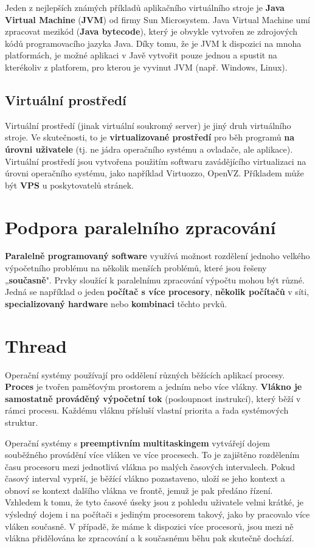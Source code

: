 Jeden z nejlepších známých příkladů aplikačního virtuálního stroje je \textbf{Java Virtual Machine} (\textbf{JVM}) od firmy Sun Microsystem. Java Virtual Machine umí zpracovat mezikód (\textbf{Java bytecode}), který je obvykle vytvořen ze zdrojových kódů programovacího jazyka Java. Díky tomu, že je JVM k dispozici na mnoha platformách, je možné aplikaci v Javě vytvořit pouze jednou a spustit na kterékoliv z platforem, pro kterou je vyvinut JVM (např. Windows, Linux).

\subsection{Virtuální prostředí}
Virtuální prostředí (jinak virtuální soukromý server) je jiný druh virtuálního stroje. Ve skutečnosti, to je \textbf{virtualizované prostředí} pro běh programů \textbf{na úrovni uživatele} (tj. ne jádra operačního systému a ovladače, ale aplikace). Virtuální prostředí jsou vytvořena použitím softwaru zavádějícího virtualizaci na úrovni operačního systému, jako například Virtuozzo, OpenVZ. Příkladem může být \textbf{VPS} u poskytovatelů stránek.

\section{Podpora paralelního zpracování}
\textbf{Paralelně programovaný software} využívá možnost rozdělení jednoho velkého výpočetního problému na několik menších problémů, které jsou řešeny „\textbf{současně}". Prvky sloužící k paralelnímu zpracování výpočtu mohou být různé. Jedná se například o jeden \textbf{počítač s více procesory}, \textbf{několik počítačů }v síti, \textbf{specializovaný hardware} nebo \textbf{kombinaci} těchto prvků.

\section{Thread}
Operační systémy používají pro oddělení různých běžících aplikací procesy. \textbf{Proces} je tvořen paměťovým prostorem a jedním nebo více vlákny. \textbf{Vlákno je samostatně prováděný výpočetní tok} (posloupnost instrukcí), který běží v rámci procesu. Každému vláknu přísluší vlastní priorita a řada systémových struktur.

Operační systémy s \textbf{preemptivním} \textbf{multitaskingem} vytvářejí dojem souběžného provádění více vláken ve více procesech. To je zajištěno rozdělením času procesoru mezi jednotlivá vlákna po malých časových intervalech. Pokud časový interval vyprší, je běžící vlákno pozastaveno, uloží se jeho kontext a obnoví se kontext dalšího vlákna ve frontě, jemuž je pak předáno řízení. Vzhledem k tomu, že tyto časové úseky jsou z pohledu uživatele velmi krátké, je výsledný dojem i na počítači s jediným procesorem takový, jako by pracovalo více vláken současně. V případě, že máme k dispozici více procesorů, jsou mezi ně vlákna přidělována ke zpracování a k současnému běhu pak skutečně dochází.

